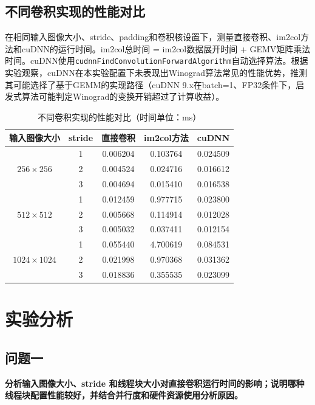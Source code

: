 \documentclass{SYSUReport}
\begin{document}
\subsection{不同卷积实现的性能对比}
在相同输入图像大小、stride、padding和卷积核设置下，测量直接卷积、im2col方法和cuDNN的运行时间。im2col总时间 = im2col数据展开时间 + GEMV矩阵乘法时间。cuDNN使用\texttt{cudnnFindConvolutionForwardAlgorithm}自动选择算法。根据实验观察，cuDNN在本实验配置下未表现出Winograd算法常见的性能优势，推测其可能选择了基于GEMM的实现路径（cuDNN 9.x在batch=1、FP32条件下，启发式算法可能判定Winograd的变换开销超过了计算收益）。

\begin{table}[H]
\centering
\caption{不同卷积实现的性能对比（时间单位：ms）}
\label{tab:conv_compare}
\begin{tabular}{|c|c|c|c|c|}
\hline
输入图像大小 & stride & 直接卷积 & im2col方法 & cuDNN \\
\hline
\multirow{3}{*}{$256\times256$}
& 1 & 0.006204 & 0.103764 & 0.024509 \\
\cline{2-5}
& 2 & 0.004524 & 0.024716 & 0.016612 \\
\cline{2-5}
& 3 & 0.004694 & 0.015410 & 0.016538 \\
\hline
\multirow{3}{*}{$512\times512$}
& 1 & 0.012459 & 0.977715 & 0.023800 \\
\cline{2-5}
& 2 & 0.005668 & 0.114914 & 0.012028 \\
\cline{2-5}
& 3 & 0.005032 & 0.037411 & 0.012154 \\
\hline
\multirow{3}{*}{$1024\times1024$}
& 1 & 0.055440 & 4.700619 & 0.084531 \\
\cline{2-5}
& 2 & 0.021998 & 0.970368 & 0.031362 \\
\cline{2-5}
& 3 & 0.018836 & 0.355535 & 0.023099 \\
\hline
\end{tabular}
\end{table}

\section{实验分析}

\subsection{问题一}

\textbf{分析输入图像大小、stride 和线程块大小对直接卷积运行时间的影响；说明哪种线程块配置性能较好，并结合并行度和硬件资源使用分析原因。}
\end{document}
